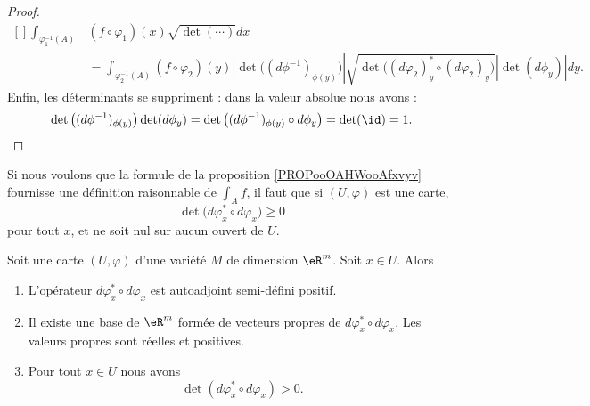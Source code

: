 \begin{proof}
\begin{equation}
        \begin{aligned}[]
        \int_{\varphi_1^{-1}(A)}&(f\circ\varphi_1)(x)\sqrt{ \det(\cdots) }dx\\
        &=\int_{\varphi^{-1}_2(A)}(f\circ\varphi_2)(y)| \det\big( (d\phi^{-1})_{\phi(y)} \big) |\sqrt{ \det\big( (d\varphi_2)_y^*\circ(d\varphi_2)_y \big) }| \det(d\phi_y) |dy.
        \end{aligned}
    \end{equation}
    Enfin, les déterminants se suppriment : dans la valeur absolue nous avons :
    \begin{equation}
        \det\big( (d\phi^{-1})_{\phi(y)} \big)\det(d\phi_y)=\det\big( (d\phi^{-1})_{\phi(y)}\circ d\phi_y \big)=\det(\id)=1.
    \end{equation}
\end{proof}

Si nous voulons que la formule de la proposition \ref{PROPooOAHWooAfxvyv} fournisse une définition raisonnable de \( \int_Af\), il faut que si \( (U,\varphi)\) est une carte,
\begin{equation}
    \det\big( d\varphi_x^*\circ d\varphi_x \big)\geq 0
\end{equation}
pour tout \( x\), et ne soit nul sur aucun ouvert de \( U\).

\begin{lemma}
    Soit une carte \( (U,\varphi)\) d'une variété \( M\) de dimension \( \eR^m\). Soit \( x\in U\). Alors
    \begin{enumerate}
        \item
            L'opérateur \( d\varphi_x^*\circ d\varphi_x\) est autoadjoint semi-défini positif.
        \item
            Il existe une base de \( \eR^m\) formée de vecteurs propres de \( d\varphi_x^*\circ d\varphi_x\). Les valeurs propres sont réelles et positives.
        \item
            Pour tout \( x\in U\) nous avons
            \begin{equation}
                \det(d\varphi_x^*\circ d\varphi_x) > 0.
            \end{equation}
    \end{enumerate}
\end{lemma}

